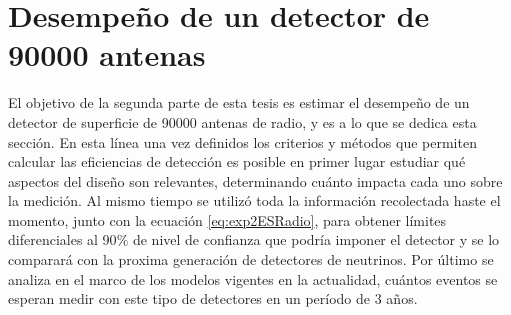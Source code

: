 



% 
% 	

	
\section{Desempe\~no de un detector de 90000 antenas}
	
	El objetivo de la segunda parte de esta tesis es estimar el desempe\~no de un detector de superficie de 90000 antenas de radio, y es a lo que se dedica esta secci\'on.
	En esta l\'inea una vez definidos los criterios y m\'etodos que permiten calcular las eficiencias de detecci\'on es posible en primer lugar estudiar qu\'e aspectos del dise\~no son relevantes, determinando cu\'anto impacta cada uno sobre la medici\'on.
	Al mismo tiempo se utiliz\'o toda la informaci\'on recolectada haste el momento, junto con la ecuaci\'on \ref{eq:exp2ESRadio}, para obtener l\'imites diferenciales al 90$\%$ de nivel de confianza que podr\'ia imponer el detector y se lo comparar\'a con la proxima generaci\'on de detectores de neutrinos.
	Por \'ultimo se analiza en el marco de los modelos vigentes en la actualidad, cu\'antos eventos se esperan medir con este tipo de detectores en un per\'iodo de 3 a\~nos.
	
